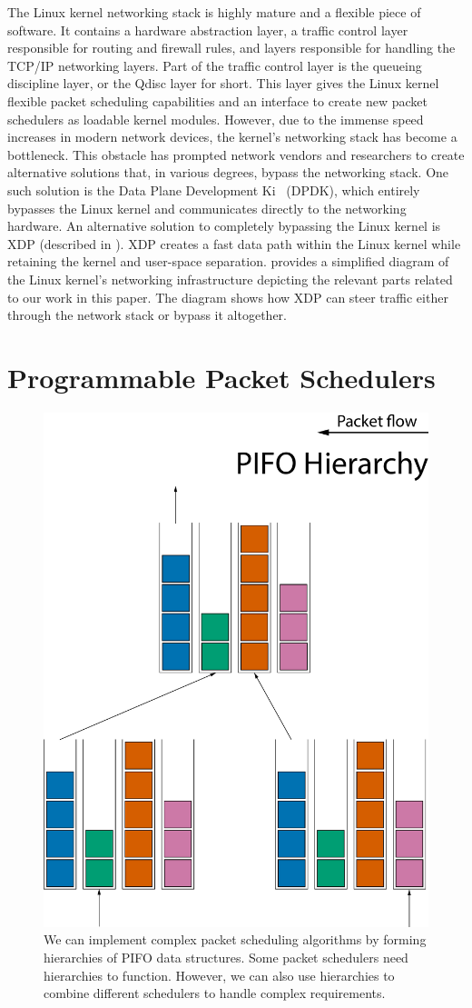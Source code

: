 \documentclass[sigconf, nonacm]{acmart}
\begin{document}
The Linux kernel networking stack is highly mature and a flexible piece of software. It contains a hardware abstraction layer, a traffic control layer responsible for routing and firewall rules, and layers responsible for handling the TCP/IP networking layers. Part of the traffic control layer is the queueing discipline layer, or the Qdisc layer for short. This layer gives the Linux kernel flexible packet scheduling capabilities and an interface to create new packet schedulers as loadable kernel modules. However, due to the immense speed increases in modern network devices, the kernel's networking stack has become a bottleneck. This obstacle has prompted network vendors and researchers to create alternative solutions that, in various degrees, bypass the networking stack. One such solution is the Data Plane Development Ki~\cite{dpdk} (DPDK), which entirely bypasses the Linux kernel and communicates directly to the networking hardware. An alternative solution to completely bypassing the Linux kernel is XDP (described in ). XDP creates a fast data path within the Linux kernel while retaining the kernel and user-space separation.  provides a simplified diagram of the Linux kernel's networking infrastructure depicting the relevant parts related to our work in this paper. The diagram shows how XDP can steer traffic either through the network stack or bypass it altogether.


\section{Programmable Packet Schedulers}

\begin{figure}
  \includegraphics[width=0.5\linewidth]{pifo-hierarchy.pdf}
  \caption{We can implement complex packet scheduling algorithms by forming hierarchies of PIFO data structures. Some packet schedulers need hierarchies to function. However, we can also use hierarchies to combine different schedulers to handle complex requirements.}
  \label{fig:pifo_hierarchy}
\end{figure}
\end{document}
